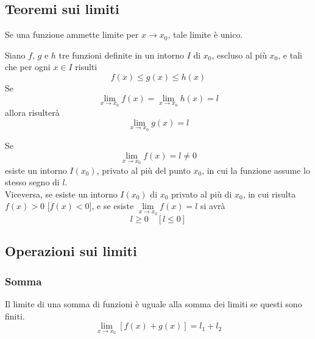 \subsection{Teoremi sui limiti}
\begin{uniLim}\hypertarget{teor:uniLim}{}
  Se una funzione ammette limite per $x\to x_0$, tale limite è unico.
\end{uniLim}
\begin{confrontoLim}\hypertarget{teor:confLim}{}
  Siano $f$, $g$ e $h$ tre funzioni definite in un intorno $I$ di $x_0$, escluso al più $x_0$, e tali
  che per ogni $x\in I$ risulti
  \begin{equation*}
    f(x)\leq g(x)\leq h(x)
  \end{equation*}
  Se
  \begin{equation*}
    \lim\limits_{x\to x_0} f(x) = \lim\limits_{x\to x_0} h(x) = l
  \end{equation*}
  allora risulterà
  \begin{equation*}
    \lim\limits_{x\to x_0}g(x)=l
  \end{equation*}
\end{confrontoLim}
\begin{permanenzaSegno}\hypertarget{teor:segno}{}
  Se
  \begin{equation*}
    \lim\limits_{x\to x_0}f(x)=l\neq0
  \end{equation*}
  esiste un intorno $I(x_0)$, privato al più del punto $x_0$, in cui la funzione assume lo stesso 
  segno di $l$.\\
  Viceversa, se esiste un intorno $I(x_0)$ di $x_0$ privato al più di $x_0$, in cui risulta $f(x)>0$
  [$f(x)<0$], e se esiste $\lim\limits_{x\to x_0}f(x)=l$ si avrà
  \begin{equation*}
    l\geq0\quad[l\leq0]
  \end{equation*}
\end{permanenzaSegno}

\subsection{Operazioni sui limiti}
\subsubsection{Somma}
\begin{sommaLimiti}\hypertarget{teor:sommaLimiti}{}
  Il limite di una somma di funzioni è uguale alla somma dei limiti se questi sono finiti.
  \begin{equation*}
    \lim\limits_{x\to x_0}[f(x)+g(x)] = l_1+l_2
  \end{equation*}
\end{sommaLimiti}

